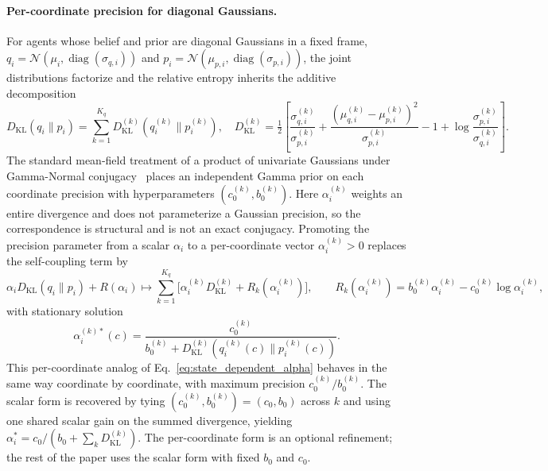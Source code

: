 \documentclass[11pt]{article}
\begin{document}
\paragraph{Per-coordinate precision for diagonal Gaussians.}
\label{par:per_coord_alpha}
For agents whose belief and prior are diagonal Gaussians in a fixed frame, $q_i = \mathcal{N}(\mu_i, \operatorname{diag}(\sigma_{q,i}))$ and $p_i = \mathcal{N}(\mu_{p,i}, \operatorname{diag}(\sigma_{p,i}))$, the joint distributions factorize and the relative entropy inherits the additive decomposition
\begin{equation}
D_{\mathrm{KL}}(q_i \| p_i) = \sum_{k=1}^{K_q} D_{\mathrm{KL}}^{(k)}(q_i^{(k)} \| p_i^{(k)}),
\quad
D_{\mathrm{KL}}^{(k)} = \tfrac{1}{2}\left[ \frac{\sigma_{q,i}^{(k)}}{\sigma_{p,i}^{(k)}} + \frac{(\mu_{q,i}^{(k)} - \mu_{p,i}^{(k)})^2}{\sigma_{p,i}^{(k)}} - 1 + \log \frac{\sigma_{p,i}^{(k)}}{\sigma_{q,i}^{(k)}} \right].
\label{eq:kl_decomposition_per_coord}
\end{equation}
The standard mean-field treatment of a product of univariate Gaussians under Gamma-Normal conjugacy~\cite[\S 10.1.3, \S 2.3.6]{Bishop2006} places an independent Gamma prior on each coordinate precision with hyperparameters $(c_0^{(k)}, b_0^{(k)})$. Here $\alpha_i^{(k)}$ weights an entire divergence and does not parameterize a Gaussian precision, so the correspondence is structural and is not an exact conjugacy. Promoting the precision parameter from a scalar $\alpha_i$ to a per-coordinate vector $\alpha_i^{(k)} > 0$ replaces the self-coupling term by
\begin{equation}
\alpha_i  D_{\mathrm{KL}}(q_i \| p_i) + R(\alpha_i)
\longmapsto
\sum_{k=1}^{K_q} \Big[\alpha_i^{(k)} D_{\mathrm{KL}}^{(k)} + R_k(\alpha_i^{(k)})\Big],
\qquad
R_k(\alpha_i^{(k)}) = b_0^{(k)} \alpha_i^{(k)} - c_0^{(k)} \log \alpha_i^{(k)},
\label{eq:adaptive_self_coupling_per_coord}
\end{equation}
with stationary solution
\begin{equation}
\boxed{
\alpha_i^{(k)*}(c) = \frac{c_0^{(k)}}{b_0^{(k)} + D_{\mathrm{KL}}^{(k)}(q_i^{(k)}(c) \| p_i^{(k)}(c))}.
}
\label{eq:state_dependent_alpha_per_coord}
\end{equation}
This per-coordinate analog of Eq.~\eqref{eq:state_dependent_alpha} behaves in the same way coordinate by coordinate, with maximum precision $c_0^{(k)}/b_0^{(k)}$. The scalar form is recovered by tying $(c_0^{(k)}, b_0^{(k)}) = (c_0, b_0)$ across $k$ and using one shared scalar gain on the summed divergence, yielding $\alpha_i^* = c_0 / (b_0 + \sum_k D_{\mathrm{KL}}^{(k)})$. The per-coordinate form is an optional refinement; the rest of the paper uses the scalar form with fixed $b_0$ and $c_0$.
\end{document}
